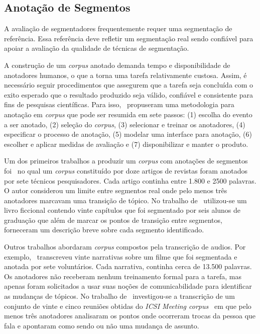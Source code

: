 \subsection{Anotação de Segmentos}
\label{sec:anotacoes}
A avaliação de segmentadores frequentemente requer uma segmentação de referência. Essa referência deve refletir um segmentação real sendo confiável para apoiar a avaliação da qualidade de técnicas de segmentação. 

A construção de um \textit{corpus} anotado demanda tempo e disponibilidade de anotadores humanos, o que a torna uma tarefa relativamente custosa. 
Assim, é necessário seguir procedimentos que assegurem que a tarefa seja concluída com o exito esperado que o resultado produzido seja válido, confiável e consistente para fins de pesquisas científicas. Para isso,~\cite{Hovy2010} propuseram uma metodologia para anotação em \textit{corpus} que pode ser resumida em sete passos: 
(1) escolha do evento a ser anotado, %
(2) seleção do \textit{corpus}, %
(3) selecionar e treinar os anotadores,
(4) especificar o processo de anotação,
(5) modelar uma interface para anotação,
(6) escolher e aplicar medidas de avaliação e 
(7) disponibilizar e manter o produto.
% 

Um dos primeiros trabalhos a produzir um \textit{corpus} com anotações de segmentos foi~\cite{Hearst1997} no qual um \textit{corpus} constituído por doze artigos de revistas foram anotados por sete técnicos pesquisadores. Cada artigo continha entre 1.800 e 2500 palavras. O autor considerou um limite entre segmentos real onde pelo menos três anotadores marcavam uma transição de tópico. No trabalho de~\cite{Kazantseva2012} utilizou-se um livro ficcional contendo vinte capítulos que foi segmentado por seis alunos de graduação que além de marcar os pontos de transição entre segmentos, forneceram um descrição breve sobre cada segmento identificado. 

Outros trabalhos abordaram \textit{corpus} compostos pela transcrição de audios. Por exemplo,~\cite{Passonneau1997} transcreveu vinte narrativas sobre um filme que foi segmentada e anotada por sete voluntários. Cada narrativa, continha cerca de 13.500 palavras. Os anotadores não receberam nenhum treinamento formal para a tarefa, mas apenas foram solicitados a usar suas noções de comunicabilidade para identificar as mudanças de tópicos. No trabalho de~\cite{Galley2003} investigou-se a transcrição de um conjunto de vinte e cinco reuniões obtidas do \textit{ICSI Meeting corpus}~\cite{Janin2003} em que pelo menos três anotadores analisaram os pontos onde ocorreram trocas da pessoa que fala e apontaram como sendo ou não uma mudança de assunto.  



